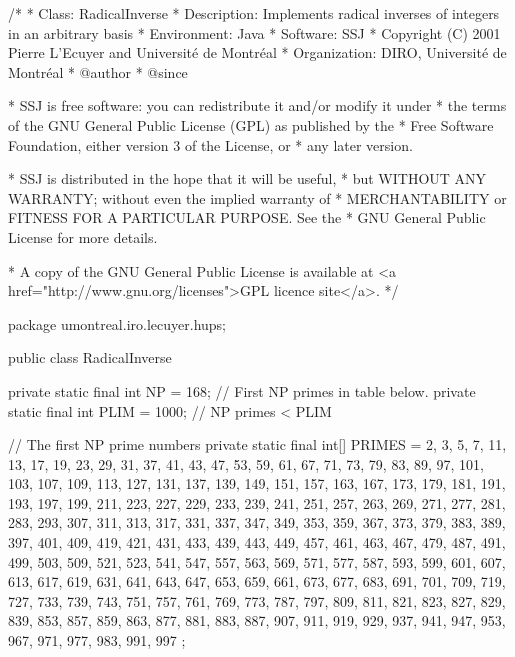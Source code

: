 \begin{code}
\begin{hide}
/*
 * Class:        RadicalInverse
 * Description:  Implements radical inverses of integers in an arbitrary basis
 * Environment:  Java
 * Software:     SSJ 
 * Copyright (C) 2001  Pierre L'Ecuyer and Université de Montréal
 * Organization: DIRO, Université de Montréal
 * @author       
 * @since

 * SSJ is free software: you can redistribute it and/or modify it under
 * the terms of the GNU General Public License (GPL) as published by the
 * Free Software Foundation, either version 3 of the License, or
 * any later version.

 * SSJ is distributed in the hope that it will be useful,
 * but WITHOUT ANY WARRANTY; without even the implied warranty of
 * MERCHANTABILITY or FITNESS FOR A PARTICULAR PURPOSE.  See the
 * GNU General Public License for more details.

 * A copy of the GNU General Public License is available at
   <a href="http://www.gnu.org/licenses">GPL licence site</a>.
 */
\end{hide}
package umontreal.iro.lecuyer.hups;


public class RadicalInverse \begin{hide} {
   private static final int NP = 168;     // First NP primes in table below.
   private static final int PLIM = 1000;  // NP primes < PLIM

   // The first NP prime numbers
   private static final int[] PRIMES = { 
    2, 3, 5, 7, 11, 13, 17, 19, 23, 29, 31, 37, 41, 43, 47, 53, 59, 61, 67,
    71, 73, 79, 83, 89, 97, 101, 103, 107, 109, 113, 127, 131, 137, 139, 
    149, 151, 157, 163, 167, 173, 179, 181, 191, 193, 197, 199, 211, 223, 
    227, 229, 233, 239, 241, 251, 257, 263, 269, 271, 277, 281, 283, 293, 
    307, 311, 313, 317, 331, 337, 347, 349, 353, 359, 367, 373, 379, 383, 
    389, 397, 401, 409, 419, 421, 431, 433, 439, 443, 449, 457, 461, 463, 
    467, 479, 487, 491, 499, 503, 509, 521, 523, 541, 547, 557, 563, 569, 
    571, 577, 587, 593, 599, 601, 607, 613, 617, 619, 631, 641, 643, 647, 
    653, 659, 661, 673, 677, 683, 691, 701, 709, 719, 727, 733, 739, 743, 
    751, 757, 761, 769, 773, 787, 797, 809, 811, 821, 823, 827, 829, 839, 
    853, 857, 859, 863, 877, 881, 883, 887, 907, 911, 919, 929, 937, 941, 
    947, 953, 967, 971, 977, 983, 991, 997 };

}
\end{hide}
\end{code}
